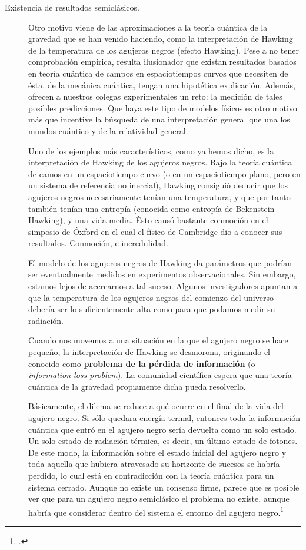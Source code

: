 \documentclass[11pt,a4paper,titlepage]{article}
\begin{document}
\begin{description}
  \item[Existencia de resultados semiclásicos.]{Otro motivo viene de las aproximaciones a la teoría cuántica de la gravedad que se han venido haciendo, como la interpretación de Hawking de la temperatura de los agujeros negros (efecto Hawking). Pese a no tener comprobación empírica, resulta ilusionador que existan resultados basados en teoría cuántica de campos en espaciotiempos curvos que necesiten de ésta, de la mecánica cuántica, tengan una hipotética explicación. Además, ofrecen a nuestros colegas experimentales un reto: la medición de tales posibles predicciones. Que haya este tipo de modelos físicos es otro motivo más que incentive la búsqueda de una interpretación general que una los mundos cuántico y de la relatividad general.

  Uno de los ejemplos más característicos, como ya hemos dicho, es la interpretación de Hawking de los agujeros negros. Bajo la teoría cuántica de camos en un espaciotiempo curvo (o en un espaciotiempo plano, pero en un sistema de referencia no inercial), Hawking consiguió deducir que los agujeros negros necesariamente tenían una temperatura, y que por tanto también tenían una entropía (conocida como entropía de Bekenstein-Hawking), y una vida media. Ésto causó bastante conmoción en el simposio de Óxford en el cual el físico de Cambridge dio a conocer sus resultados. Conmoción, e incredulidad.

  El modelo de los agujeros negros de Hawking da parámetros que podrían ser eventualmente medidos en experimentos observacionales. Sin embargo, estamos lejos de acercarnos a tal suceso. Algunos investigadores apuntan a que la temperatura de los agujeros negros del comienzo del universo debería ser lo suficientemente alta como para que podamos medir su radiación.

  Cuando nos movemos a una situación en la que el agujero negro se hace pequeño, la interpretación de Hawking se desmorona, originando el conocido como \textbf{problema de la pérdida de información} (o \textit{information-loss problem}). La comunidad científica espera que una teoría cuántica de la gravedad propiamente dicha pueda resolverlo.

  Básicamente, el dilema se reduce a qué ocurre en el final de la vida del agujero negro. Si sólo quedara energía termal, entonces toda la información cuántica que entró en el agujero negro sería devuelta como un solo estado. Un solo estado de radiación térmica, es decir, un último estado de fotones. De este modo, la información sobre el estado inicial del agujero negro y toda aquella que hubiera atravesado su horizonte de sucesos se habría perdido, lo cual está en contradicción con la teoría cuántica para un sistema cerrado. Aunque no existe un consenso firme, parece que es posible ver que para un agujero negro semiclásico el problema no existe, aunque habría que considerar dentro del sistema el entorno del agujero negro.\footnote{\cite[p.~4]{paper_osorio}.}

}
\end{description}
\end{document}
